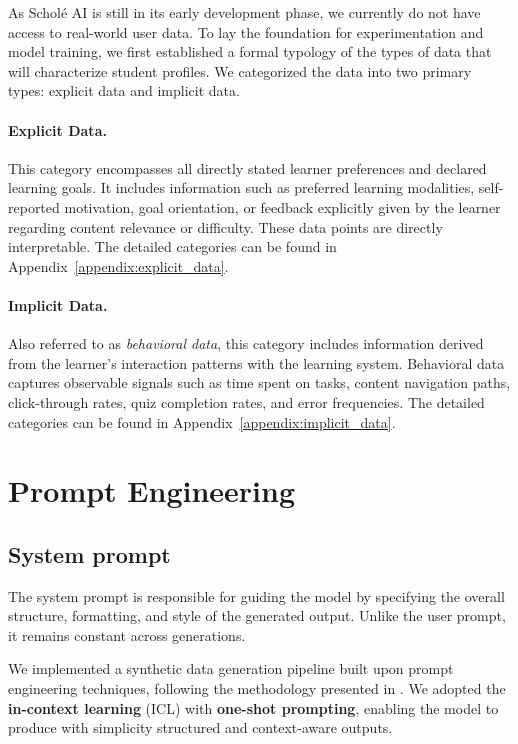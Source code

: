 As Schol\'e AI is still in its early development phase, we currently do not have access to real-world user data. To lay the foundation for experimentation and model training, we first established a formal typology of the types of data that will characterize student profiles. We categorized the data into two primary types: explicit data and implicit data.

\paragraph{Explicit Data.}  
This category encompasses all directly stated learner preferences and declared learning goals. It includes information such as preferred learning modalities, self-reported motivation, goal orientation, or feedback explicitly given by the learner regarding content relevance or difficulty. These data points are directly interpretable. The detailed categories can be found in Appendix~\ref{appendix:explicit_data}.

\paragraph{Implicit Data.}  
Also referred to as \textit{behavioral data}, this category includes information derived from the learner's interaction patterns with the learning system. Behavioral data captures observable signals such as time spent on tasks, content navigation paths, click-through rates, quiz completion rates, and error frequencies. The detailed categories can be found in Appendix~\ref{appendix:implicit_data}.

\section{Prompt Engineering}

\subsection{System prompt} The system prompt is responsible for guiding the model by specifying the overall structure, formatting, and style of the generated output. Unlike the user prompt, it remains constant across generations.

We implemented a synthetic data generation pipeline built upon prompt engineering techniques, following the methodology presented in \cite{sahoo2025systematicsurveypromptengineering}. We adopted the   \textbf{in-context learning} (ICL) \cite{dong2024surveyincontextlearning} with \textbf{one-shot prompting}, enabling the model to produce with simplicity structured and context-aware outputs. 

